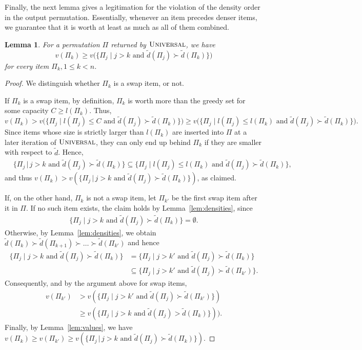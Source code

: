 \documentclass[11pt]{article}
\newtheorem{lemma}[theorem]{Lemma}
\newcommand{\innerand}{\text{ and }}
\begin{document}
Finally, the next lemma gives a legitimation for the violation of
the density order in the output permutation. Essentially, whenever
an item precedes denser items, we guarantee that it is worth at least
as much as all of them combined.
\begin{lemma}
For a permutation $\Pi$ returned by $\textsc{Universal}$, we have
\[
v(\Pi_{k})\geq v\bigl(\bigl\{\Pi_{j}\mid j>k\innerand\tilde{d}(\Pi_{j})\succ\tilde{d}(\Pi_{k})\bigr\}\bigr)
\]
for every item $\Pi_{k},1\leq k<n$. \label{lem:order_violation_legitimation} \end{lemma}
\begin{proof}
We distinguish whether $\Pi_{k}$ is a swap item, or not.

If $\Pi_{k}$ is a swap item, by definition, $\Pi_{k}$ is worth more
than the greedy set for some capacity $C\geq l(\Pi_{k})$. Thus,
\[
v(\Pi_{k})>v\bigl(\bigl\{\Pi_{j}\mid l(\Pi_{j})\leq C\innerand\tilde{d}(\Pi_{j})\succ\tilde{d}(\Pi_{k})\bigr\}\bigr)\geq
v\bigl(\bigl\{\Pi_{j}\mid l(\Pi_{j})\leq l(\Pi_{k})\innerand\tilde{d}(\Pi_{j})\succ\tilde{d}(\Pi_{k})\bigr\}\bigr).
\]
 Since items whose size is strictly larger than $l(\Pi_{k})$ are
inserted into $\Pi$ at a later iteration of $\textsc{Universal}$,
they can only end up behind $\Pi_{k}$ if they are smaller with respect
to $\tilde{d}$. Hence, 
\begin{align*}
 & \{\Pi_{j}\,|\, j>k\innerand\tilde{d}(\Pi_{j})\succ\tilde{d}(\Pi_{k})\}\subseteq\{\Pi_{j}\mid l(\Pi_{j})\leq
l(\Pi_{k})\innerand\tilde{d}(\Pi_{j})\succ\tilde{d}(\Pi_{k})\},
\end{align*}
and thus $v(\Pi_{k})>v(\{\Pi_{j}\,|\, j>k\innerand\tilde{d}(\Pi_{j})\succ\tilde{d}(\Pi_{k})\})$,
as claimed.

If, on the other hand, $\Pi_{k}$ is not a swap item, let $\Pi_{k'}$
be the first swap item after it in $\Pi$. If no such item exists,
the claim holds by Lemma~\ref{lem:densities}, since 
\begin{align*}
\bigl\{\Pi_{j}\mid j>k\innerand\tilde{d}(\Pi_{j})\succ\tilde{d}(\Pi_{k})\bigr\}=\emptyset.
\end{align*}
Otherwise, by Lemma~\ref{lem:densities}, we obtain
$\tilde{d}(\Pi_{k})\succ\tilde{d}(\Pi_{k+1})\succ\dots\succ\tilde{d}(\Pi_{k'})$
and hence 
\begin{align*}
\{\Pi_{j}\mid j>k\innerand\tilde{d}(\Pi_{j})\succ\tilde{d}(\Pi_{k})\} & =\{\Pi_{j}\mid
j>k'\innerand\tilde{d}(\Pi_{j})\succ\tilde{d}(\Pi_{k})\}\\
 & \subseteq\{\Pi_{j}\mid j>k'\innerand\tilde{d}(\Pi_{j})\succ\tilde{d}(\Pi_{k'})\}.
\end{align*}
Consequently, and by the argument above for swap items, 
\begin{align*}
v(\Pi_{k'}) & >v(\{\Pi_{j}\mid j>k'\innerand\tilde{d}(\Pi_{j})\succ\tilde{d}(\Pi_{k'})\})\\
 & \geq v(\{\Pi_{j}\mid j>k\innerand\tilde{d}(\Pi_{j})>\tilde{d}(\Pi_{k})\})).
\end{align*}
Finally, by Lemma~\ref{lem:values}, we have $v(\Pi_{k})\geq v(\Pi_{k'})\geq v(\{\Pi_{j}\,|\,
j>k\innerand\tilde{d}(\Pi_{j})\succ\tilde{d}(\Pi_{k})\})$.
\end{proof}
\end{document}
